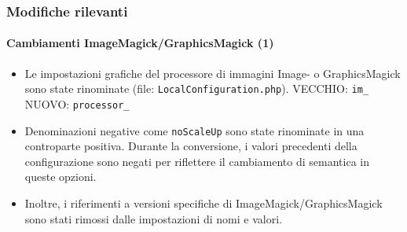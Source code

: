 \begin{frame}[fragile]
	\frametitle{Modifiche rilevanti}
	\framesubtitle{Cambiamenti ImageMagick/GraphicsMagick (1)}

	\lstset{basicstyle=\tiny\ttfamily}

	\begin{itemize}

		\item Le impostazioni grafiche del processore di immagini Image- o GraphicsMagick sono state rinominate
			(file: \texttt{LocalConfiguration.php}).\newline
			VECCHIO: \texttt{im\_}\newline
			NUOVO: \texttt{processor\_}

		\item Denominazioni negative come \texttt{noScaleUp} sono state rinominate in una controparte positiva.
			Durante la conversione, i valori precedenti della configurazione sono negati per riflettere il 
			cambiamento di semantica in queste opzioni.

		\item Inoltre, i riferimenti a versioni specifiche di ImageMagick/GraphicsMagick sono stati rimossi dalle
			impostazioni di nomi e valori.

	\end{itemize}

\end{frame}

